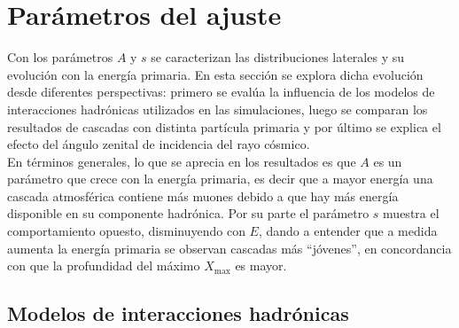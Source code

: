 \documentclass[12pt,letterpaper]{report}
\begin{document}
		
\section{Par\'ametros del ajuste}
Con los par\'ametros $A$ y $s$ se caracterizan las distribuciones laterales y su evoluci\'on con la energ\'ia primaria. En esta secci\'on se explora dicha evoluci\'on desde diferentes perspectivas: primero se eval\'ua la influencia de los modelos de interacciones hadr\'onicas utilizados en las simulaciones, luego se comparan los resultados de cascadas con distinta part\'icula primaria y por \'ultimo se explica el efecto del \'angulo zenital de incidencia del rayo c\'osmico. \\

En t\'erminos generales, lo que se aprecia en los resultados es que $A$ es un par\'ametro que crece con la energ\'ia primaria, es decir que a mayor energ\'ia una cascada atmosf\'erica contiene m\'as muones debido a que hay m\'as energ\'ia disponible en su componente hadr\'onica. Por su parte el par\'ametro $s$ muestra el comportamiento opuesto, disminuyendo con $E$, dando a entender que a medida aumenta la energ\'ia primaria se observan cascadas m\'as ``j\'ovenes'', en concordancia con que la profundidad del m\'aximo $X_{\text{max}}$ es mayor.

	\subsection{Modelos de interacciones hadr\'onicas}
	
\end{document}
